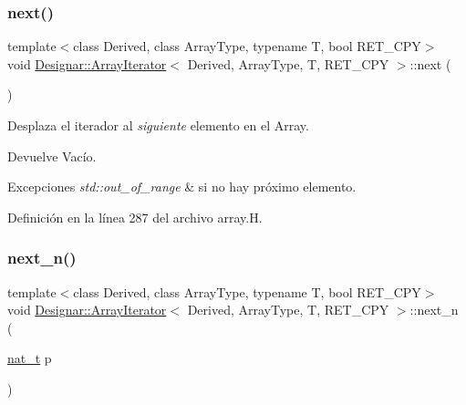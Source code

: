\mbox{\label{class_designar_1_1_array_iterator_ac4e929d3247b68c3c9cffb43ec0891ec}} 
\subsubsection{\texorpdfstring{next()}{next()}}
{\footnotesize\ttfamily template$<$class Derived, class Array\+Type, typename T, bool R\+E\+T\+\_\+\+C\+PY$>$ \\
void \hyperlink{class_designar_1_1_array_iterator}{Designar\+::\+Array\+Iterator}$<$ Derived, Array\+Type, T, R\+E\+T\+\_\+\+C\+PY $>$\+::next (\begin{DoxyParamCaption}{ }\end{DoxyParamCaption})\hspace{0.3cm}{\ttfamily [inline]}}



Desplaza el iterador al {\itshape siguiente} elemento en el Array. 

\begin{DoxyReturn}{Devuelve}
Vacío. 
\end{DoxyReturn}

\begin{DoxyExceptions}{Excepciones}
{\em std\+::out\+\_\+of\+\_\+range} & si no hay próximo elemento. \\
\hline
\end{DoxyExceptions}


Definición en la línea 287 del archivo array.\+H.

\mbox{\label{class_designar_1_1_array_iterator_a8709128b09b8b177fa1b042cb330c3e5}} 
\subsubsection{\texorpdfstring{next\+\_\+n()}{next\_n()}}
{\footnotesize\ttfamily template$<$class Derived, class Array\+Type, typename T, bool R\+E\+T\+\_\+\+C\+PY$>$ \\
void \hyperlink{class_designar_1_1_array_iterator}{Designar\+::\+Array\+Iterator}$<$ Derived, Array\+Type, T, R\+E\+T\+\_\+\+C\+PY $>$\+::next\+\_\+n (\begin{DoxyParamCaption}\item[{\hyperlink{namespace_designar_aa72662848b9f4815e7bf31a7cf3e33d1}{nat\+\_\+t}}]{p }\end{DoxyParamCaption})\hspace{0.3cm}{\ttfamily [inline]}}



